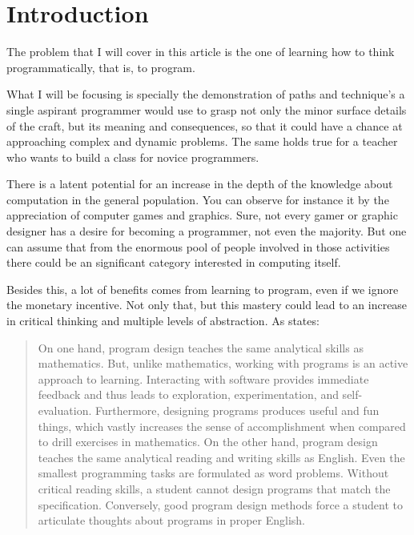 \section{Introduction}
The problem that I will cover in this article is the one of learning how to
think programmatically, that is, to program.

What I will be focusing is specially the demonstration of paths and technique's
a single aspirant programmer would use to grasp not only the minor surface
details of the craft, but its meaning and consequences, so that it could have a
chance at approaching complex and dynamic problems. The same holds true for a
teacher who wants to build a class for novice programmers.

There is a latent potential for an increase in the depth of the knowledge about
computation in the general population. You can observe for instance it by the
appreciation of computer games and graphics. Sure, not every gamer or graphic
designer has a desire for becoming a programmer, not even the majority. But one
can assume that from the enormous pool of people involved in those activities
there could be an significant category interested in computing itself.

Besides this, a lot of benefits comes from learning to program, even if we
ignore the monetary incentive. \cite{education:sussman__why_programming_is_a_good_medium}
Not only that, but this mastery could lead to an increase in critical thinking
and multiple levels of abstraction. As \cite{education:felleisen__htdp} states:

\begin{quotation}
    On one hand, program design teaches the same analytical skills as mathematics.
    But, unlike mathematics, working with programs is an active approach to
    learning. Interacting with software provides immediate feedback and thus leads
    to exploration, experimentation, and self-evaluation. Furthermore, designing
    programs produces useful and fun things, which vastly increases the sense of
    accomplishment when compared to drill exercises in mathematics. On the other
    hand, program design teaches the same analytical reading and writing skills as
    English. Even the smallest programming tasks are formulated as word problems.
    Without critical reading skills, a student cannot design programs that match the
    specification. Conversely, good program design methods force a student to
    articulate thoughts about programs in proper English.
\end{quotation}

